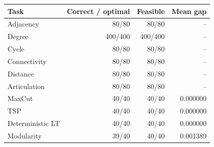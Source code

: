 \begin{tabular}{lrrr}
\toprule
Task & Correct / optimal & Feasible & Mean gap \\
\midrule
Adjacency & 80/80 & 80/80 & -- \\
Degree & 400/400 & 400/400 & -- \\
Cycle & 80/80 & 80/80 & -- \\
Connectivity & 80/80 & 80/80 & -- \\
Distance & 80/80 & 80/80 & -- \\
Articulation & 80/80 & 80/80 & -- \\
MaxCut & 40/40 & 40/40 & 0.000000 \\
TSP & 40/40 & 40/40 & 0.000000 \\
Deterministic LT & 40/40 & 40/40 & 0.000000 \\
Modularity & 39/40 & 40/40 & 0.001389 \\
\bottomrule
\end{tabular}
